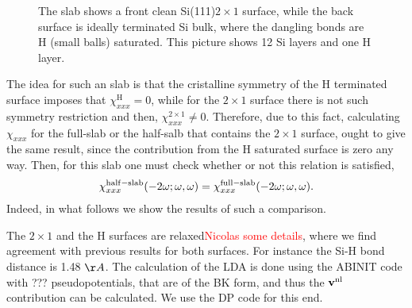 \begin{figure}
\caption{The slab shows a front clean Si(111)$2\times 1$ surface,
  while the back surface is ideally terminated Si bulk, where the
  dangling bonds are H (small balls) saturated. This picture shows 12
  Si layers and one H layer. 
\label{si2x1}} 
\end{figure}
The idea for such an slab is that the cristalline symmetry of the
H terminated surface imposes that $\chi^{\mathrm{H}}_{xxx}=0$, while
for the $2\times 1$ surface there is not such symmetry restriction and
then, $\chi^{2\times 1}_{xxx}\ne 0$.
Therefore, due to this fact, calculating $\chi_{xxx}$ for the full-slab
or the half-salb that contains the $2\times 1$ surface,
 ought to give the same result, since the contribution from the H
 saturated  surface is zero any way. Then, for this slab one must check
 whether or not this relation is satisfied,
\begin{align}\label{hs}
\chi^{\mathrm{half-slab}}_{xxx}(-2\omega;\omega,\omega)
=
\chi^{\mathrm{full-slab}}_{xxx}(-2\omega;\omega,\omega)
.
\end{align}
Indeed, in what follows we show the results of such a comparison.

The $2\times 1$ and the H surfaces are relaxed\textcolor{red}{Nicolas
  some details}, where we find agreement with previous results for
both surfaces.\cite{relax} For instance the Si-H bond distance is 1.48 $\AA$.
The calculation of the LDA is done using the ABINIT code with ???
pseudopotentials, that are of the BK form, and thus the $\mathbf{v}^{\mathrm{nl}}$
contribution can be calculated. We use the DP code for this end.
